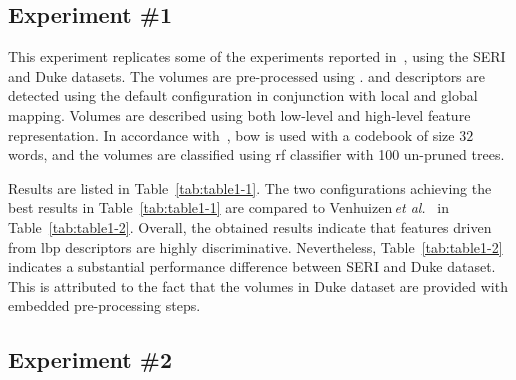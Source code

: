 \subsection{Experiment \#1}\label{subsec:exp1}

%
%
%

This experiment replicates some of the experiments reported in~\cite{Lemaintre2015miccaiOCT}, using the SERI and Duke datasets.
The volumes are pre-processed using \nlm.
\lbp and \lbptop descriptors are detected using the default configuration in conjunction with local and global mapping.
Volumes are described using both low-level and high-level feature representation.
In accordance with~\cite{Lemaintre2015miccaiOCT}, \ac{bow} is used with a codebook of size $32$ words, and the volumes are classified using \ac{rf} classifier with 100 un-pruned trees.

Results are listed in Table~\ref{tab:table1-1}.
The two configurations achieving the best results in Table~\ref{tab:table1-1} are compared to Venhuizen\,\textit{et al.}~\cite{Venhuizen2015} in Table~\ref{tab:table1-2}. 
Overall, the obtained results indicate that features driven from \ac{lbp} descriptors are highly discriminative.
Nevertheless, Table~\ref{tab:table1-2} indicates a substantial performance difference between SERI and Duke dataset.
This is attributed to the fact that the volumes in Duke dataset are provided with embedded pre-processing steps.






\subsection{Experiment \#2}\label{subsec:exp2}
%
%
%
%

